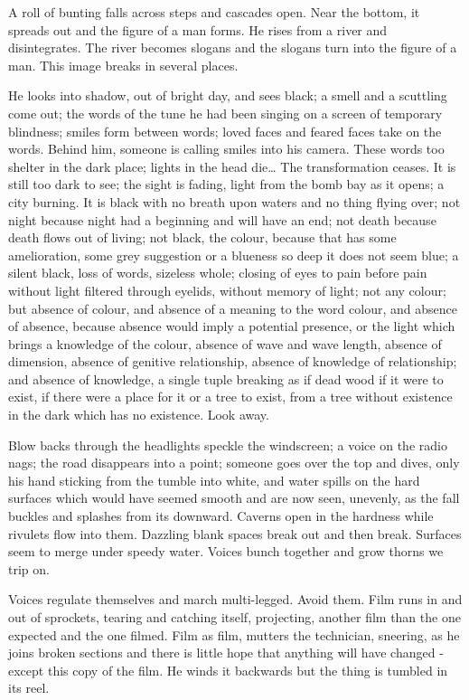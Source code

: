 \documentclass[
]{memoir}
\begin{document}
A roll of bunting falls across steps and cascades open. Near the bottom,
it spreads out and the figure of a man forms. He rises from a river and
disintegrates. The river becomes slogans and the slogans turn into the
figure of a man. This image breaks in several places.

He looks into shadow, out of bright day, and sees black; a smell and a
scuttling come out; the words of the tune he had been singing on a
screen of temporary blindness; smiles form between words; loved faces
and feared faces take on the words. Behind him, someone is calling
smiles into his camera. These words too shelter in the dark place;
lights in the head die\ldots{} The transformation ceases. It is still
too dark to see; the sight is fading, light from the bomb bay as it
opens; a city burning. It is black with no breath upon waters and no
thing flying over; not night because night had a beginning and will have
an end; not death because death flows out of living; not black, the
colour, because that has some amelioration, some grey suggestion or a
blueness so deep it does not seem blue; a silent black, loss of words,
sizeless whole; closing of eyes to pain before pain without light
filtered through eyelids, without memory of light; not any colour; but
absence of colour, and absence of a meaning to the word colour, and
absence of absence, because absence would imply a potential presence, or
the light which brings a knowledge of the colour, absence of wave and
wave length, absence of dimension, absence of genitive relationship,
absence of knowledge of relationship; and absence of knowledge, a single
tuple breaking as if dead wood if it were to exist, if there were a
place for it or a tree to exist, from a tree without existence in the
dark which has no existence. Look away.

Blow backs through the headlights speckle the windscreen; a voice on the
radio nags; the road disappears into a point; someone goes over the top
and dives, only his hand sticking from the tumble into white, and water
spills on the hard surfaces which would have seemed smooth and are now
seen, unevenly, as the fall buckles and splashes from its downward.
Caverns open in the hardness while rivulets flow into them. Dazzling
blank spaces break out and then break. Surfaces seem to merge under
speedy water. Voices bunch together and grow thorns we trip on.

Voices regulate themselves and march multi-legged. Avoid them. Film runs
in and out of sprockets, tearing and catching itself, projecting,
another film than the one expected and the one filmed. Film as film,
mutters the technician, sneering, as he joins broken sections and there
is little hope that anything will have changed - except this copy of the
film. He winds it backwards but the thing is tumbled in its reel.
\end{document}
